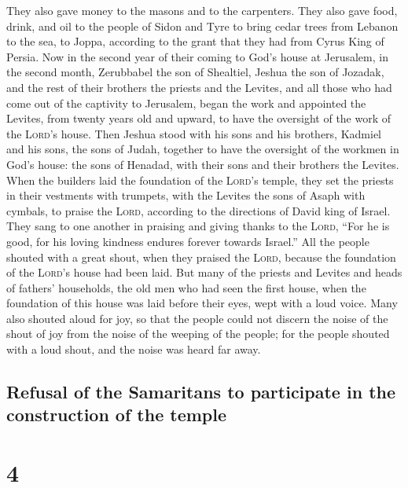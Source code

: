  They also gave money to the masons and to the carpenters.
They also gave food, drink, and oil to the people of Sidon and Tyre to
bring cedar trees from Lebanon to the sea, to Joppa, according to the
grant that they had from Cyrus King of Persia.  Now in the
second year of their coming to God's house at Jerusalem, in the second
month, Zerubbabel the son of Shealtiel, Jeshua the son of Jozadak, and
the rest of their brothers the priests and the Levites, and all those
who had come out of the captivity to Jerusalem, began the work and
appointed the Levites, from twenty years old and upward, to have the
oversight of the work of the \textsc{Lord}'s house.  Then
Jeshua stood with his sons and his brothers, Kadmiel and his sons, the
sons of Judah, together to have the oversight of the workmen in God's
house: the sons of Henadad, with their sons and their brothers the
Levites.  When the builders laid the foundation of the
\textsc{Lord}'s temple, they set the priests in their vestments with
trumpets, with the Levites the sons of Asaph with cymbals, to praise the
\textsc{Lord}, according to the directions of David king of Israel.
 They sang to one another in praising and giving thanks
to the \textsc{Lord}, ``For he is good, for his loving kindness endures
forever towards Israel.'' All the people shouted with a great shout,
when they praised the \textsc{Lord}, because the foundation of the
\textsc{Lord}'s house had been laid.  But many of the
priests and Levites and heads of fathers' households, the old men who
had seen the first house, when the foundation of this house was laid
before their eyes, wept with a loud voice. Many also shouted aloud for
joy,  so that the people could not discern the noise of
the shout of joy from the noise of the weeping of the people; for the
people shouted with a loud shout, and the noise was heard far away.

\hypertarget{refusal-of-the-samaritans-to-participate-in-the-construction-of-the-temple}{%
\subsection{Refusal of the Samaritans to participate in the construction
of the
temple}\label{refusal-of-the-samaritans-to-participate-in-the-construction-of-the-temple}}

\hypertarget{section-3}{%
\section{4}\label{section-3}}

